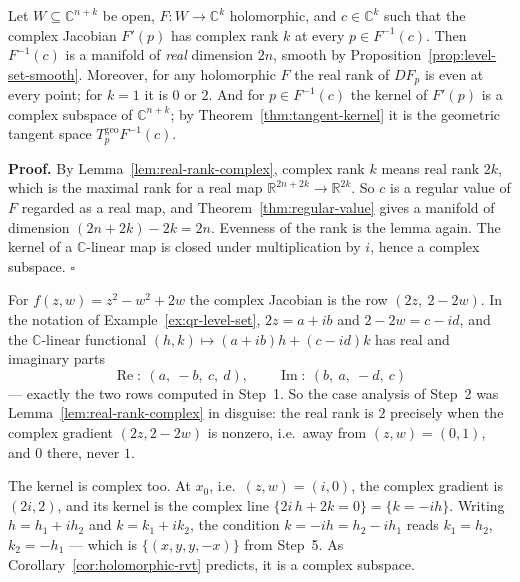 \documentclass[11pt]{report}
\makeatletter
\newcounter{thmcounter}[section]
\renewenvironment{proof}[1][Proof]{\noindent\textbf{#1.} }{\hfill$\square$\par\vspace{5pt}}
\newcommand{\thmlabel}[1]{\edef\@currentlabel{\arabic{section}.\arabic{thmcounter}}\label{#1}}
\newcommand{\geo}{\mathrm{geo}}
\newcommand{\leeref}[1]{\par\smallskip{\raggedleft\footnotesize\textsc{Lee}:\ #1\par}}
\makeatother
\begin{document}
\begin{corbox}\thmlabel{cor:holomorphic-rvt}
Let $W \subseteq \mathbb{C}^{n+k}$ be open, $F : W \to \mathbb{C}^k$ holomorphic, and $c \in \mathbb{C}^k$ such that the complex Jacobian $F'(p)$ has complex rank $k$ at every $p \in F^{-1}(c)$. Then $F^{-1}(c)$ is a manifold of \emph{real} dimension $2n$, smooth by Proposition~\ref{prop:level-set-smooth}. Moreover, for any holomorphic $F$ the real rank of $DF_p$ is even at every point; for $k = 1$ it is $0$ or $2$. And for $p \in F^{-1}(c)$ the kernel of $F'(p)$ is a complex subspace of $\mathbb{C}^{n+k}$; by Theorem~\ref{thm:tangent-kernel} it is the geometric tangent space $T^{\geo}_p F^{-1}(c)$.
\leeref{no counterpart; from Assignment 2}
\end{corbox}

\begin{proof}
By Lemma~\ref{lem:real-rank-complex}, complex rank $k$ means real rank $2k$, which is the maximal rank for a real map $\mathbb{R}^{2n+2k} \to \mathbb{R}^{2k}$. So $c$ is a regular value of $F$ regarded as a real map, and Theorem~\ref{thm:regular-value} gives a manifold of dimension $(2n+2k) - 2k = 2n$. Evenness of the rank is the lemma again. The kernel of a $\mathbb{C}$-linear map is closed under multiplication by $i$, hence a complex subspace.
\end{proof}

\begin{rembox}\label{rem:example-re-read}
For $f(z,w) = z^2 - w^2 + 2w$ the complex Jacobian is the row $(2z,\ 2 - 2w)$. In the notation of Example~\ref{ex:qr-level-set}, $2z = a + ib$ and $2 - 2w = c - id$, and the $\mathbb{C}$-linear functional $(h, k) \mapsto (a+ib)h + (c-id)k$ has real and imaginary parts
\[
\operatorname{Re}:\ (a,\ -b,\ c,\ d), \qquad \operatorname{Im}:\ (b,\ a,\ -d,\ c)
\]
--- exactly the two rows computed in Step~1. So the case analysis of Step~2 was Lemma~\ref{lem:real-rank-complex} in disguise: the real rank is $2$ precisely when the complex gradient $(2z, 2-2w)$ is nonzero, i.e.\ away from $(z,w) = (0,1)$, and $0$ there, never $1$.

The kernel is complex too. At $x_0$, i.e.\ $(z,w) = (i, 0)$, the complex gradient is $(2i, 2)$, and its kernel is the complex line $\{2i\,h + 2k = 0\} = \{k = -i h\}$. Writing $h = h_1 + i h_2$ and $k = k_1 + i k_2$, the condition $k = -ih = h_2 - i h_1$ reads $k_1 = h_2$, $k_2 = -h_1$ --- which is $\{(x,y,y,-x)\}$ from Step~5. As Corollary~\ref{cor:holomorphic-rvt} predicts, it is a complex subspace.
\end{rembox}
\end{document}
